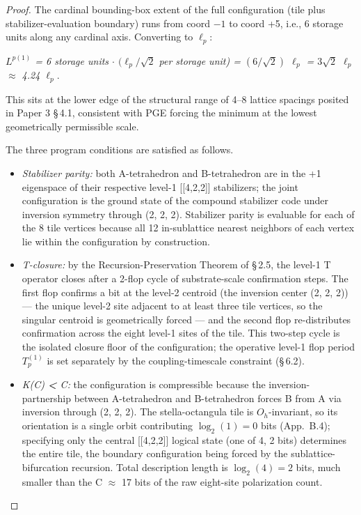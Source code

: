 \documentclass[11pt,oneside]{report}
\theoremstyle{definition}
\theoremstyle{remark}
\begin{document}
\begin{proof}
The cardinal bounding-box extent of the full configuration (tile plus
stabilizer-evaluation boundary) runs from coord \ensuremath{-1} to coord +5, i.e., 6
storage units along any cardinal axis. Converting to \ensuremath{\ell_{p}:}

\emph{\ensuremath{L^{p(1)}} = 6 storage units \ensuremath{\cdot} \ensuremath{(\ell_{p}/\sqrt{2}} per storage unit) = \ensuremath{(6/\sqrt{2})} \ensuremath{\ell_{p}} =
\ensuremath{3\sqrt{2}} \ensuremath{\ell_{p}} \ensuremath{\approx} 4.24 \ensuremath{\ell_{p}.}}

This sits at the lower edge of the structural range of 4--8 lattice
spacings posited in Paper 3 \S\,4.1, consistent with PGE forcing the
minimum at the lowest geometrically permissible scale.

The three program conditions are satisfied as follows.

\begin{itemize}
\item
  \emph{Stabilizer parity:} both A-tetrahedron and B-tetrahedron are in
  the +1 eigenspace of their respective level-1 [[4,2,2]]
  stabilizers; the joint configuration is the ground state of the
  compound stabilizer code under inversion symmetry through (2, 2, 2).
  Stabilizer parity is evaluable for each of the 8 tile vertices because
  all 12 in-sublattice nearest neighbors of each vertex lie within the
  configuration by construction.
\end{itemize}

\begin{itemize}
\item
  \emph{T-closure:} by the Recursion-Preservation Theorem of \S\,2.5, the
  level-1 T operator closes after a 2-flop cycle of substrate-scale
  confirmation steps. The first flop confirms a bit at the level-2
  centroid (the inversion center (2, 2, 2)) --- the unique level-2 site
  adjacent to at least three tile vertices, so the singular centroid is
  geometrically forced --- and the second flop re-distributes confirmation
  across the eight level-1 sites of the tile. This two-step cycle is the
  isolated closure floor of the configuration; the operative level-1 flop
  period \ensuremath{T_{p}^{(1)}} is set separately by the
  coupling-timescale constraint (\S\,6.2).
\end{itemize}

\begin{itemize}
\item
  \emph{K(C) \textbf{\textless{}} \textbar C\textbar:} the configuration
  is compressible because the inversion-partnership between
  A-tetrahedron and B-tetrahedron forces B from A via inversion through
  (2, 2, 2). The stella-octangula tile is \ensuremath{O_{h}}-invariant, so its
  orientation is a single orbit contributing \ensuremath{\log_2(1) = 0} bits
  (App.~B.4); specifying only the central [[4,2,2]] logical state (one of
  4, 2 bits) determines the entire tile, the boundary configuration being
  forced by the sublattice-bifurcation recursion. Total description length
  is \ensuremath{\log_2(4) = 2} bits, much smaller than the \textbar C\textbar{}
  \ensuremath{\approx} 17 bits of the raw eight-site polarization count.
\end{itemize}


\end{proof}
\end{document}
